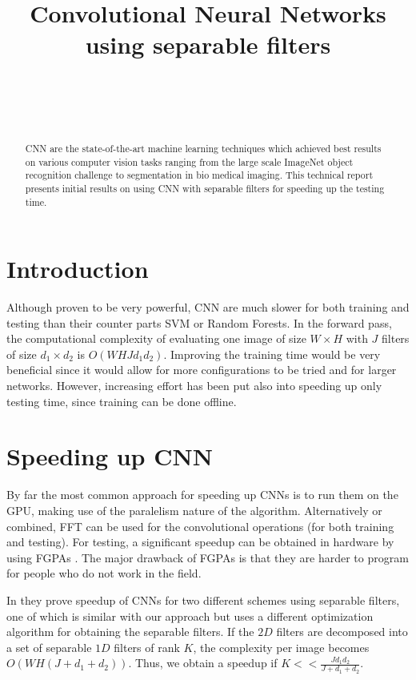 \documentclass{article} %
\title{Convolutional Neural Networks using separable filters}
\author{
\fontsize{8}{8}\selectfont{Petrescu Viviana}\\
\fontsize{8}{8}\selectfont{EPFL} \\
\fontsize{8}{8}\selectfont{\texttt{viviana.petrescu@epfl.ch}} \\
}
\begin{document}
\maketitle

\begin{abstract}
CNN are the state-of-the-art machine learning techniques which achieved best results on various computer vision tasks ranging from the large scale ImageNet object recognition challenge to segmentation in bio medical imaging.
This technical report presents initial results on using CNN with separable filters for speeding up the testing time.
\end{abstract}

\section{Introduction}
Although proven to be very powerful, CNN are much slower for both training and testing than their counter parts SVM or Random Forests.
In the forward pass, the computational complexity of evaluating one image of size $W\times H$ with $J$ filters of size $d_{1}\times d_{2}$ is $O(WHJd_{1}d_{2})$.
Improving the training time would be very beneficial since it would allow for more configurations to be tried and for larger networks. However, increasing effort has been put also into speeding up only testing time, since training can be done offline.

\section{Speeding up CNN}
By far the most common approach for speeding up CNNs is to run them on the GPU, making use of the paralelism nature of the algorithm. Alternatively or combined, FFT can be used for the convolutional operations (for  both training and testing)\cite{DBLP:journals/corr/MathieuHL13}.  For testing, a significant speedup can be obtained in hardware by using FGPAs \citep{lecun2010convolutional}. The major drawback of FGPAs is that they are harder to program for people who do not work in the field.

 In \citep{DBLP:dblp_journals/pami/SironiTRLF15}\citep{Jaderberg14b} they prove speedup of CNNs for two different schemes using separable filters, one of which is similar with our approach but uses a different optimization algorithm for obtaining the separable filters. 
  If the $2D$ filters are decomposed into a set of separable $1D$ filters of rank $K$, the complexity per image becomes
 $O(WH(J +d_{1}+d_{2}))$. Thus, we obtain a speedup if $K<< \frac{Jd_{1}d_{2}}{J +d_{1}+d_{2}}$. 
\end{document}
